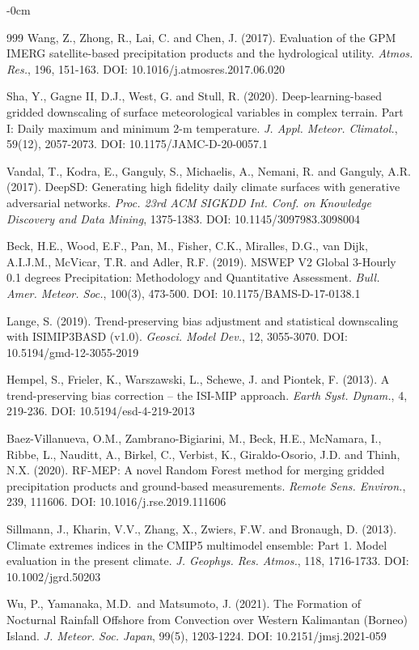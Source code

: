 \documentclass[remotesensing,article,submit,pdftex,moreauthors]{Definitions/mdpi}
\begin{document}
\begin{adjustwidth}{-\extralength}{0cm}
\begin{thebibliography}{999}
 Wang, Z., Zhong, R., Lai, C. and Chen, J. (2017). Evaluation of
the GPM IMERG satellite-based precipitation products and the
hydrological utility. \emph{Atmos. Res.}, 196, 151-163. DOI:
10.1016/j.atmosres.2017.06.020

 Sha, Y., Gagne II, D.J., West, G. and Stull, R. (2020).
Deep-learning-based gridded downscaling of surface meteorological
variables in complex terrain. Part I: Daily maximum and minimum 2-m
temperature. \emph{J. Appl. Meteor. Climatol.}, 59(12), 2057-2073. DOI:
10.1175/JAMC-D-20-0057.1

 Vandal, T., Kodra, E., Ganguly, S., Michaelis, A., Nemani, R.
and Ganguly, A.R. (2017). DeepSD: Generating high fidelity daily climate
surfaces with generative adversarial networks. \emph{Proc. 23rd ACM
SIGKDD Int. Conf. on Knowledge Discovery and Data Mining}, 1375-1383.
DOI: 10.1145/3097983.3098004

 Beck, H.E., Wood, E.F., Pan, M., Fisher, C.K., Miralles, D.G.,
van Dijk, A.I.J.M., McVicar, T.R. and Adler, R.F. (2019). MSWEP V2
Global 3-Hourly 0.1 degrees Precipitation: Methodology and Quantitative
Assessment. \emph{Bull. Amer. Meteor. Soc.}, 100(3), 473-500. DOI:
10.1175/BAMS-D-17-0138.1

 Lange, S. (2019). Trend-preserving bias adjustment and
statistical downscaling with ISIMIP3BASD (v1.0). \emph{Geosci. Model
Dev.}, 12, 3055-3070. DOI: 10.5194/gmd-12-3055-2019

 Hempel, S., Frieler, K., Warszawski, L., Schewe, J. and
Piontek, F. (2013). A trend-preserving bias correction -- the ISI-MIP
approach. \emph{Earth Syst. Dynam.}, 4, 219-236. DOI:
10.5194/esd-4-219-2013

 Baez-Villanueva, O.M., Zambrano-Bigiarini, M., Beck, H.E.,
McNamara, I., Ribbe, L., Nauditt, A., Birkel, C., Verbist, K.,
Giraldo-Osorio, J.D. and Thinh, N.X. (2020). RF-MEP: A novel Random
Forest method for merging gridded precipitation products and
ground-based measurements. \emph{Remote Sens. Environ.}, 239, 111606.
DOI: 10.1016/j.rse.2019.111606

 Sillmann, J., Kharin, V.V., Zhang, X., Zwiers, F.W. and
Bronaugh, D. (2013). Climate extremes indices in the CMIP5 multimodel
ensemble: Part 1. Model evaluation in the present climate. \emph{J.
Geophys. Res. Atmos.}, 118, 1716-1733. DOI: 10.1002/jgrd.50203

 Wu, P., Yamanaka, M.D.~and Matsumoto, J. (2021). The Formation
of Nocturnal Rainfall Offshore from Convection over Western Kalimantan
(Borneo) Island. \emph{J. Meteor. Soc. Japan}, 99(5), 1203-1224. DOI:
10.2151/jmsj.2021-059




\end{thebibliography}

\end{adjustwidth}
\end{document}

